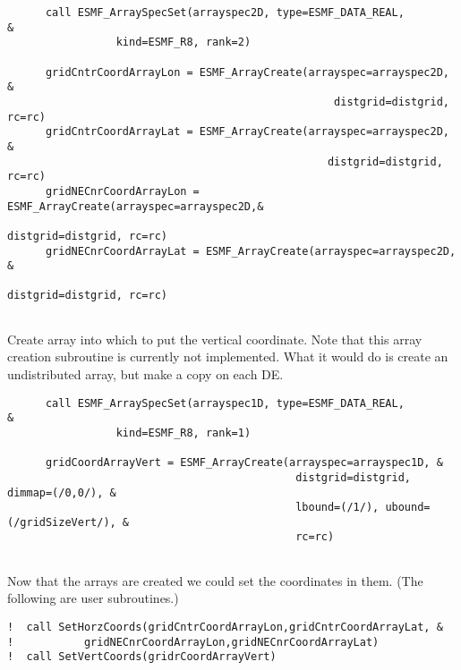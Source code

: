  \begin{verbatim}
      call ESMF_ArraySpecSet(arrayspec2D, type=ESMF_DATA_REAL,         &
                 kind=ESMF_R8, rank=2)

      gridCntrCoordArrayLon = ESMF_ArrayCreate(arrayspec=arrayspec2D, &
                                                   distgrid=distgrid, rc=rc)
      gridCntrCoordArrayLat = ESMF_ArrayCreate(arrayspec=arrayspec2D, &
                                                  distgrid=distgrid, rc=rc)
      gridNECnrCoordArrayLon = ESMF_ArrayCreate(arrayspec=arrayspec2D,&
                                                      distgrid=distgrid, rc=rc)
      gridNECnrCoordArrayLat = ESMF_ArrayCreate(arrayspec=arrayspec2D, &
                                                     distgrid=distgrid, rc=rc)
 
\end{verbatim}
 

    Create array into which to put the vertical coordinate.
   Note that this array creation subroutine is currently not implemented. What it would do is
   create an undistributed array, but make a copy on each DE.  

 \begin{verbatim}
      call ESMF_ArraySpecSet(arrayspec1D, type=ESMF_DATA_REAL,         &
                 kind=ESMF_R8, rank=1)

      gridCoordArrayVert = ESMF_ArrayCreate(arrayspec=arrayspec1D, &
                                             distgrid=distgrid, dimmap=(/0,0/), &
                                             lbound=(/1/), ubound=(/gridSizeVert/), &
                                             rc=rc) 
 
\end{verbatim}
 

   Now that the arrays are created we could set the coordinates in them.
   (The following are user subroutines.) 

 \begin{verbatim}
!  call SetHorzCoords(gridCntrCoordArrayLon,gridCntrCoordArrayLat, &
!           gridNECnrCoordArrayLon,gridNECnrCoordArrayLat)
!  call SetVertCoords(gridrCoordArrayVert)

 
\end{verbatim}
 
